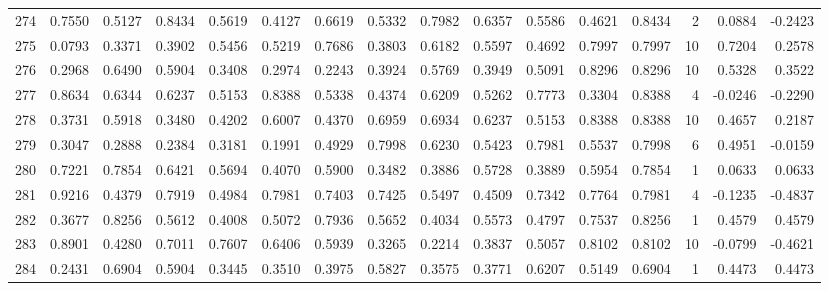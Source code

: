 \begin{tabular}{lrrrrrrrrrrrrrrr}
274 &      0.7550 &  0.5127 &  0.8434 &  0.5619 &  0.4127 &  0.6619 &  0.5332 &  0.7982 &  0.6357 &  0.5586 &   0.4621 &     0.8434 &      2 &                    0.0884 &                    -0.2423 \\
275 &      0.0793 &  0.3371 &  0.3902 &  0.5456 &  0.5219 &  0.7686 &  0.3803 &  0.6182 &  0.5597 &  0.4692 &   0.7997 &     0.7997 &     10 &                    0.7204 &                     0.2578 \\
276 &      0.2968 &  0.6490 &  0.5904 &  0.3408 &  0.2974 &  0.2243 &  0.3924 &  0.5769 &  0.3949 &  0.5091 &   0.8296 &     0.8296 &     10 &                    0.5328 &                     0.3522 \\
277 &      0.8634 &  0.6344 &  0.6237 &  0.5153 &  0.8388 &  0.5338 &  0.4374 &  0.6209 &  0.5262 &  0.7773 &   0.3304 &     0.8388 &      4 &                   -0.0246 &                    -0.2290 \\
278 &      0.3731 &  0.5918 &  0.3480 &  0.4202 &  0.6007 &  0.4370 &  0.6959 &  0.6934 &  0.6237 &  0.5153 &   0.8388 &     0.8388 &     10 &                    0.4657 &                     0.2187 \\
279 &      0.3047 &  0.2888 &  0.2384 &  0.3181 &  0.1991 &  0.4929 &  0.7998 &  0.6230 &  0.5423 &  0.7981 &   0.5537 &     0.7998 &      6 &                    0.4951 &                    -0.0159 \\
280 &      0.7221 &  0.7854 &  0.6421 &  0.5694 &  0.4070 &  0.5900 &  0.3482 &  0.3886 &  0.5728 &  0.3889 &   0.5954 &     0.7854 &      1 &                    0.0633 &                     0.0633 \\
281 &      0.9216 &  0.4379 &  0.7919 &  0.4984 &  0.7981 &  0.7403 &  0.7425 &  0.5497 &  0.4509 &  0.7342 &   0.7764 &     0.7981 &      4 &                   -0.1235 &                    -0.4837 \\
282 &      0.3677 &  0.8256 &  0.5612 &  0.4008 &  0.5072 &  0.7936 &  0.5652 &  0.4034 &  0.5573 &  0.4797 &   0.7537 &     0.8256 &      1 &                    0.4579 &                     0.4579 \\
283 &      0.8901 &  0.4280 &  0.7011 &  0.7607 &  0.6406 &  0.5939 &  0.3265 &  0.2214 &  0.3837 &  0.5057 &   0.8102 &     0.8102 &     10 &                   -0.0799 &                    -0.4621 \\
284 &      0.2431 &  0.6904 &  0.5904 &  0.3445 &  0.3510 &  0.3975 &  0.5827 &  0.3575 &  0.3771 &  0.6207 &   0.5149 &     0.6904 &      1 &                    0.4473 &                     0.4473 \\

\end{tabular}
